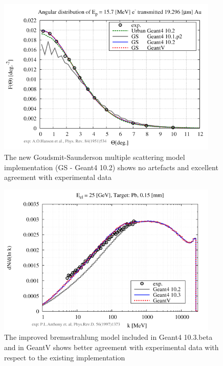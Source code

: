 \documentclass[12pt,a4paper]{article}
\begin{document}
\begin{figure}[bthp]
\centering
\includegraphics[width=0.94\textwidth]{image5.png}
\caption{The new Goudsmit-Saunderson multiple scattering
model implementation (GS - Geant4 10.2) shows no artefacts and excellent
agreement with experimental data}
\label{fig:gs}
\end{figure}

\begin{figure}[bthp]
\centering
\includegraphics[width=0.94\textwidth]{image6.png}
\caption{The improved bremsstrahlung model included in Geant4
10.3.beta and in GeantV shows better agreement with experimental data
with respect to the existing implementation}
\label{fig:brem}
\end{figure}
\end{document}
